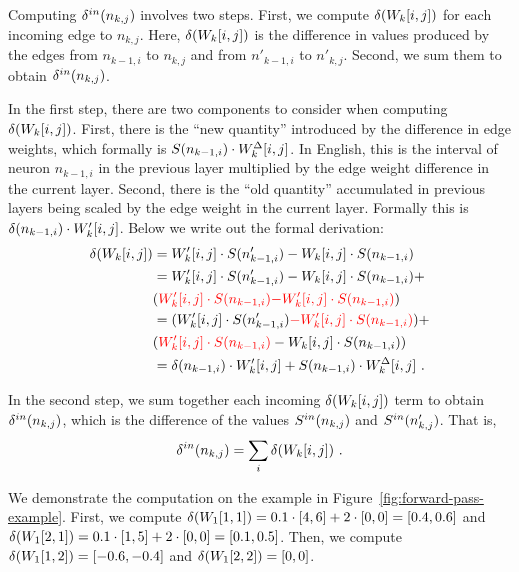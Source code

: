 Computing $\delta^{in}(n_{k,j})$ involves two steps.
First, we compute $\delta(W_k[i,j])$ for each incoming edge to
$n_{k,j}$. Here, $\delta(W_k[i,j])$ is the difference in values produced
by the edges from $n_{k-1,i}$ to $n_{k,j}$ and from $n'_{k-1,i}$ to
$n'_{k,j}$.
%
Second, we sum them to obtain $\delta^{in}(n_{k,j})$.



In the first step, there are two components to consider when computing
$\delta(W_k[i,j])$.
%
First, there is the ``new quantity''
introduced by the difference in edge weights, which formally is
$S(n_{k-1,i}) \cdot W^\Delta_k[i,j]$. In English,
this is the interval of neuron $n_{k-1,i}$ in the previous layer multiplied by the edge
weight difference in the current layer.
%
Second, there is the ``old quantity'' accumulated in previous
layers being scaled by the edge weight in the current layer. Formally this is
$\delta(n_{k-1,i}) \cdot W'_k[i,j]$. Below we write out the formal
derivation:
\begin{align*}
 \delta(W_k[i,j]) &= W'_k[i,j] \cdot S(n'_{k-1,i}) - W_k[i,j] \cdot S(n_{k-1, i}) \\
 			&= W'_k[i,j] \cdot S(n'_{k-1,i}) - W_k[i,j] \cdot S(n_{k-1, i}) + \\
			&   (\textcolor{red}{W'_k[i,j] \cdot S(n_{k-1, i})} \textcolor{red}{- W'_k[i,j] \cdot S(n_{k-1, i})}) \\
 			&=  (W'_k[i,j] \cdot S(n'_{k-1,i}) \textcolor{red}{- W'_k[i,j] \cdot S(n_{k-1, i})}) + \\
			&   (\textcolor{red}{W'_k[i,j] \cdot S(n_{k-1, i})} - W_k[i,j] \cdot S(n_{k-1, i})) \\
 			&= \delta(n_{k-1,i}) \cdot W'_k[i,j] + S(n_{k-1,i}) \cdot W^\Delta_k[i,j]
                            ~.
\end{align*}


In the second step, we sum together each incoming
$\delta(W_k[i,j])$ term to obtain $\delta^{in}(n_{k,j})$,
which is the difference of the values $S^{in}(n_{k,j})$ and
$S^{in}(n'_{k,j})$.  That is,
\[
  \delta^{in}(n_{k,j}) = \sum_i \delta(W_k[i,j])   ~.
\]


We demonstrate the computation on the example in
Figure~\ref{fig:forward-pass-example}.  First, we compute
$\delta(W_1[1,1]) = 0.1 \cdot [4,6] + 2 \cdot [0,0] = [0.4,
0.6] $ and $\delta(W_1[2,1]) = 0.1 \cdot [1,5] + 2 \cdot [0,0]
= [0.1,0.5] $.
%
Then, we compute
$\delta(W_1[1,2]) = [-0.6, -0.4] $ and
$\delta(W_1[2,2]) = [0,0] $.

